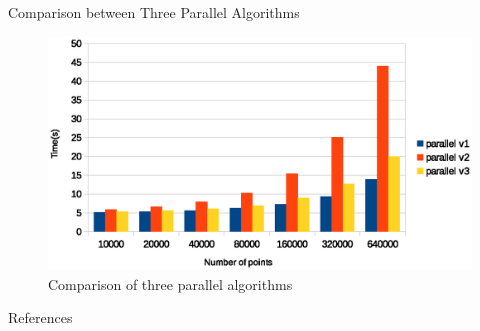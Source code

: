\documentclass[
nopagebreaks,
style=klope,
fleqn]{powerdot}
\begin{document}
\begin{slide}{Comparison between Three Parallel Algorithms}
  \begin{figure}[!h]
    \centering  
    \includegraphics[width=0.9\linewidth]{fig/parallel_algorithm_comparison}
    \caption{Comparison of three parallel algorithms}
    \label{fig:par}
  \end{figure}
\end{slide}

\begin{slide} {References}
\footnotesize


\end{slide}
\end{document}
